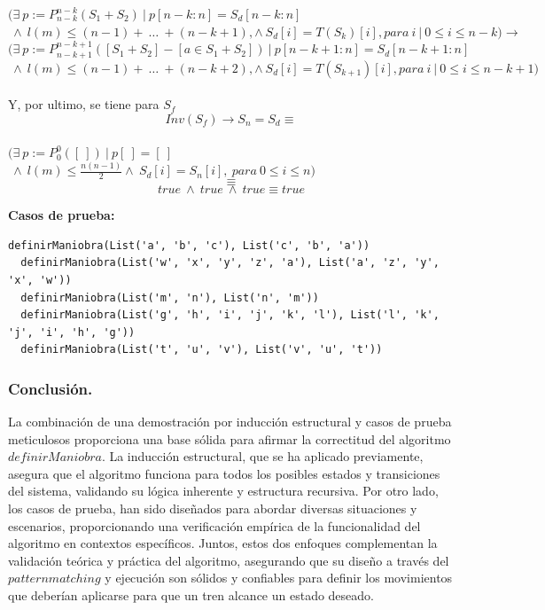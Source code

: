 \documentclass[12pt, a4paper]{article}
\begin{document}
$(\exists~p := P_{n-k}^{n-k} ( S_1  + S_2)~|~p[n-k:n] = S_d[n-k:n]$ $~\land~l(m) \leq (n-1) +~\ldots~+ (n-k+1), \land ~S_d[i] = T(S_k)[i],para~ i~|~0 \leq i \leq n-k) \rightarrow$ \\
$(\exists~p := P_{n-k+1}^{n-k+1} ([S_1+ S_2]-[a \in S_1 + S_2])~|~p[n-k+1:n] = S_d[n-k+1:n]$ $~\land~l(m) \leq (n-1) +~\ldots~+ (n-k+2), \land ~S_d[i] = T(S_{k+1})[i],para~ i~|~0 \leq i \leq n-k+1)$ \\ \\
Y, por ultimo, se tiene para $S_f$ \\
\[Inv(S_f) \rightarrow S_n = S_d \equiv\] \\
$(\exists~p := P_0^0 ([~])~|~p[~] = [~]$ $~\land~l(m) \leq \frac{n(n-1)}{2} \land ~S_d[i] = S_{n}[i], ~para~0 \leq i \leq n)$  \\
\[
\equiv
\]
\[true~\land~true~\land~true  \equiv true \]


\textbf{Casos de prueba: } \\
\begin{lstlisting}[caption=Para ver los valores esperados por favor referirse al archivo de pruebas.sc. Debido a que los resultados son tan extensos que dañan la estructura del documento., label=lst:scala_code]
  definirManiobra(List('a', 'b', 'c'), List('c', 'b', 'a'))
  definirManiobra(List('w', 'x', 'y', 'z', 'a'), List('a', 'z', 'y', 'x', 'w'))
  definirManiobra(List('m', 'n'), List('n', 'm'))
  definirManiobra(List('g', 'h', 'i', 'j', 'k', 'l'), List('l', 'k', 'j', 'i', 'h', 'g'))
  definirManiobra(List('t', 'u', 'v'), List('v', 'u', 't'))
  \end{lstlisting}
\subsubsection{Conclusión.}
La combinación de una demostración por inducción estructural y casos de prueba meticulosos proporciona una base sólida para afirmar la correctitud del algoritmo $definirManiobra$. La inducción estructural, que se ha aplicado previamente, asegura que el algoritmo funciona para todos los posibles estados y transiciones del sistema, validando su lógica inherente y estructura recursiva. Por otro lado, los casos de prueba, han sido diseñados para abordar diversas situaciones y escenarios, proporcionando una verificación empírica de la funcionalidad del algoritmo en contextos específicos. Juntos, estos dos enfoques complementan la validación teórica y práctica del algoritmo, asegurando que su diseño a través del $pattern matching$ y ejecución son sólidos y confiables para definir los movimientos que deberían aplicarse para que un tren alcance un estado deseado.
\end{document}
